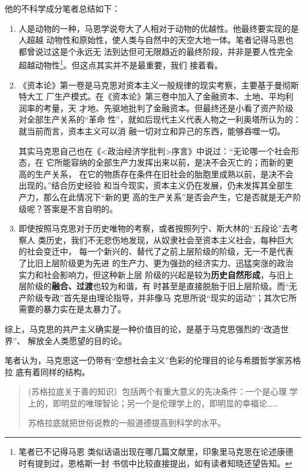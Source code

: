 他的不科学成分笔者总结如下：
\begin{enumerate}
\item 人是动物的一种，马恩学说夸大了人相对于动物的优越性。他最终要实现的是人超越
  动物性和原始性，使人类与自然中的天空大地一体。笔者记得马恩也都曾说过这是个永远无
  法到达但可无限趋近的最终阶段，并非是要人性完全超越动物性\footnote{笔者已不记得马恩
    类似话语出现在哪几篇文献里，印象里马克思在论述康德时有提到过，恩格斯一封
    书信中比较直接提出，如有读者知晓还望告知。}。但这点其实并不是最重要，我们
  接着看。

\item 《资本论》第一卷是马克思对资本主义一般规律的现实考察，主要基于曼彻斯特大工
  厂生产模式。在《资本论》第三卷中加入了金融资本、土地、平均利润率的考量，天
  才地、先驱地批判了金融资本。但最终还是小看了资产阶级对全部生产关系的“革命
  性”，就如后现代主义代表人物之一利奥塔所认为的：就当前而言，资本主义可以消
  融一切对立和异己的东西，能够吞噬一切。

  其实马克思自己也在《<政治经济学批判>序言》中说过：“无论哪一个社会形态，在
  它所能容纳的全部生产力发挥出来以前，是决不会灭亡的；而新的更高的生产关系，
  在它的物质存在条件在旧社会的胎胞里成熟以前，是决不会出现的。”结合历史经验
  和当今现实，资本主义仍在发展，仍未发挥其全部生产力，那么在此情况下“新的更
  高的生产关系”是否会产生，它是否就是无产阶级呢？答案是不言自明的。

\item 即使按照马克思对于历史唯物的考察，或者按照列宁、斯大林的“五段论”去考察人
  类历史，我们不无悲伤地发现，从奴隶社会至资本主义社会，每种巨大的社会变迁中，
  每一个新兴的、替代了之前上层阶级的阶级，无一不是代表了比旧上层阶级更为先进
  的生产力、更为强劲的经济实力、迅猛突涨的政治实力和社会影响力，但这种新上层
  阶级的兴起是较为\textbf{历史自然形成}，与旧上层阶级的\textbf{融合、过渡}也较为和谐，有
  时甚至是直接脱胎于旧上层阶级。而“无产阶级专政”首先是由理论指导，并非像马
  克思所说“现实的运动”；其次它所需要的暴力实在是太暴力了。
\end{enumerate}

综上，马克思的共产主义确实是一种价值目的论，是基于马克思强烈的“改造世界”、
解放全人类愿望的目的论。

笔者认为，马克思这一仍带有“空想社会主义”色彩的伦理目的论与希腊哲学家苏格拉
底有着同样的结构。
\begin{quotation}
  (苏格拉底关于善的知识）包括两个有重大意义的先决条件：一个是心理
  学上的，即明显的唯理智论；另一个是伦理学上的，即明显的幸福论……

  苏格拉底就把世俗说教的一般道德提高到科学的水平。
\end{quotation}

